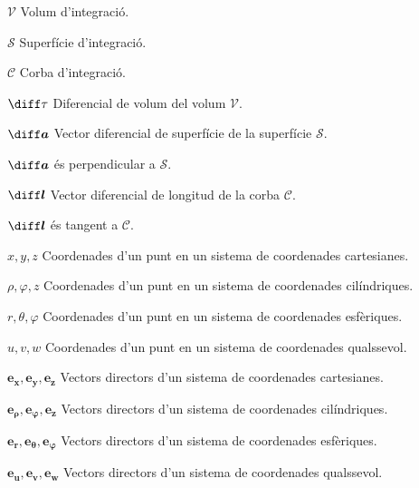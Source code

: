 \documentclass[catalan,a4paper,twoside,11pt]{article}
\begin{document}
\begin{list}{}
{\setlength{\labelwidth}{16mm}
\setlength{\leftmargin}{20mm}\setlength{\labelsep}{4mm}}
   \item[$\mathscr{V}$] Volum d'integració.

   \item[$\mathscr{S}$] Superfície d'integració.

   \item[$\mathscr{C}$] Corba d'integració.

   \item[$\diff\tau$] Diferencial de volum del volum $\mathscr{V}$.

   \item[$\boldsymbol{\diff a}$] Vector diferencial de superfície de la superfície $\mathscr{S}$.

   $\boldsymbol{\diff a}$ és perpendicular a $\mathscr{S}$.

   \item[$\boldsymbol{\diff l}$] Vector diferencial de longitud de la corba
   $\mathscr{C}$.

   $\boldsymbol{\diff l}$ és tangent a $\mathscr{C}$.

   \item[$x,y,z$] Coordenades d'un punt en un sistema de coordenades cartesianes.

   \item[$\rho,\varphi,z$] Coordenades d'un punt en un sistema de   coordenades cilíndriques.

   \item[$r,\theta,\varphi$] Coordenades d'un punt en un sistema de   coordenades esfèriques.

   \item[$u,v,w$] Coordenades d'un punt en un sistema de   coordenades qualssevol.
   \item[$\boldsymbol{e_x},\boldsymbol{e_y},\boldsymbol{e_z}$]
   Vectors directors d'un sistema de  coordenades    cartesianes.

   \item[$\boldsymbol{e_\rho},\boldsymbol{e_\varphi},\boldsymbol{e_z}$] Vectors directors d'un sistema de   coordenades cilíndriques.

   \item[$\boldsymbol{e_r},\boldsymbol{e_\theta},\boldsymbol{e_\varphi}$] Vectors directors d'un sistema de   coordenades esfèriques.

   \item[$\boldsymbol{e_u},\boldsymbol{e_v},\boldsymbol{e_w}$]
   Vectors directors d'un sistema de  coordenades   qualssevol.


\end{list}
\end{document}
